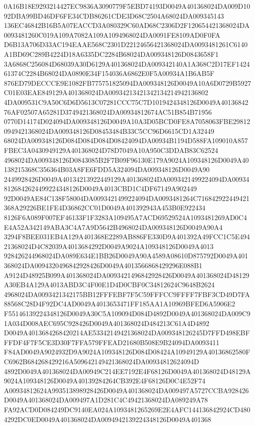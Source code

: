 \documentclass[UTF8,fontset=fandol,zihao=-4,a4paper]{ctexart}
\begin{document}
{{0A16B18E9293214427EC9836A3090779F5EBD74193D0049A401368024DA009D1092DBA99BD46DF6FE34CDB86261CDE3D68C2504A68024DA009345143
136EC46842B16B5A07EACCD3A080329C60AD68C2306D2F120654421368024DA0093481260C019A109A7082A109A1094968024DA0091FE8109AD0F0FA
D6B13A706D33AC194EAAE568C2301D22124656421368024DA0093481261C6140A1BD69C289B4224D18A6335DC2284B68024DA009348126D0843658F1
3A6868C256084D68039A30D6129A401368024DA009342140A1A368C2D17EF142461374C2284B68024DA0890E34F154036A6862E0F5A00934A1B6AB5F
876ED79DECCCE9E1082FB775751825094DA009348126D0049A10A6D0729B5927C01E03EAE849129A401368024DA00934213421342134214942136802
4DA009531C9A50C6D6D5613C07281CCC75C7D1019424348126D0049A4013684276AF02507A65281D3749421368024DA00934812674AC51B854B71956
0770D14174D024094DA009348126D0049A10A3D05BCD0FE8A7058063FBE298120949421368024DA009348126D08453484B33C5CC96D6615CD1A32449
68024DA009348126D084D084D084D08424094DA00934B1194D588FA109010A857FBEC3A0430949129A401368024D78D7049A10A950C3DDAB83C62524
4968024DA009348126D0843085B2F7B09F96130E179A9024A109348126D0049A40138215368C356364B03A8FE6FDD5A324094DA009348126D0049A90
2449928426D0049A40134213922449129A401368024DA0093421499224094DA009348126842624499224348126D0049A4013CBD1C4DF67149A902449
92D0049AE84C138F58004DA0093421499224094DA0093481264C716842922449421368A29226BE1FE4D36862CC01D0049A401392943A453B0E922434
8126F6A089F007EF46133F1F3283A109495A7ACD69529524A1093481269AD0C4E4A52A342149ABA3C4A7A9D5642B4968024DA009348126D0049A90A4
3294F8BEE031EB4A129A401368E2289AB886FE330D9A401392A49FCC1C5E49421368024D4C82039A4013684292D0049A9024A109348126D0049A4013
928426244968024DA089E634E1BB26D0049A90A4589A08610D875792D0049A401368024DA0094320496842928426D0049A4013566868429296E088B1
A9124D48925B099A401368024DA0093421496842928426D0049A401368024D48129A30EB4A129A4013ABD3C4F00E1D4D0CBF0C34812624C9648B2624
4968024DA0093421342175BB12FFFEBF7F5C59FFFCC9FFFF7FBF3CD49D7FA88568C28D4F92DC4AD0049A4013653471FF185AA1A10969BFED6A5906E2
F55146139224348126D0049A30C5A109094D084D4892D0049A401368024DA009C91A034D008AEC695C928426D0049A401368024D484213C61A4D4892
D0049A4013684268420214AE53342149421368024DA009348126245D7FFD498EBFFFDF4F7F5CE3D30F7FFA579FFEAD21680B508E9B24094DA0093411
F84AD0049A9024932D9A9024A109348126D084D08424A10949129A40136862580FC6962B684268429216A509642149421368024DA00934812624094D
4892D0049A401368024DA00949C214EE7192E4F68126D0049A401368024D48129A9024A109348126D0049A40139284264CB392E4F68126D0C4E52F74
A00934812624A993513898928426D0049A401368024DA009497A5727CCBA928426D0049A401368024DA009497A1D281C4C49421368024DA089249A78
FA92ACD0D084249DC9140EA024A1093481265269E2E4AFC144136842924CD4804292DC0ED0049A401368024DA0094942139224348126D0049A401368
}}
\end{document}
